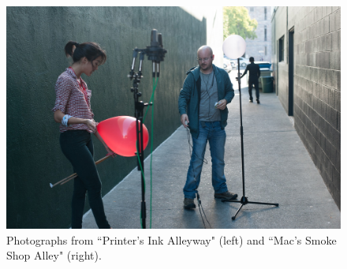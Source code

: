 \documentclass{aes137}
\begin{document}
\begin{figure}[h!]
\begin{minipage}[b]{0.68\linewidth}
\includegraphics[width=\textwidth]{images/pic_M13.jpg}
\end{minipage}
\caption{Photographs from ``Printer's Ink Alleyway" (left) and ``Mac's Smoke Shop Alley" (right). }
\end{figure}
\end{document}

